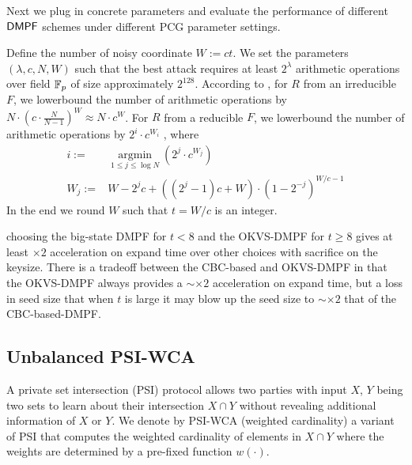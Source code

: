 

Next we plug in concrete parameters and evaluate the performance of different ${\sf DMPF}$ schemes under different PCG parameter settings. 

Define the number of noisy coordinate $W:=ct$. We set the parameters $(\lambda, c, N, W)$ such that the best attack requires at least $2^\lambda$ arithmetic operations over field $\mathbb{F}_p$ of size approximately $2^{128}$. According to \cite{cryptoeprint:2022/1035}, for $R$ from an irreducible $F$, we lowerbound the number of arithmetic operations by $N\cdot (c\cdot \frac{N}{N-1})^W\approx N\cdot c^W$.  For $R$ from a reducible $F$, we lowerbound the number of arithmetic operations by $2^i\cdot c^{W_i}$ , where 
\[
  \begin{split}
    i:=&\mathop{\arg\min}\limits_{1\le j\le \log N}\left(2^j\cdot c^{W_j}\right)\\ W_j:=&W-2^jc+((2^j-1)c+W)\cdot \left(1-2^{-j}\right)^{W/c-1}
  \end{split}
\]
 In the end we round $W$ such that $t=W/c$ is an integer. 


 choosing the big-state DMPF for $t<8$ and the OKVS-DMPF for $t\ge 8$ gives at least $\times 2$ acceleration on expand time over other choices with sacrifice on the keysize. There is a tradeoff between the CBC-based and OKVS-DMPF in that the OKVS-DMPF always provides a $\sim\times 2$ acceleration on expand time, but a loss in seed size that when $t$ is large it may blow up the seed size to $\sim \times 2$ that of the CBC-based-DMPF. 

\subsection{Unbalanced PSI-WCA}
A private set intersection (PSI) protocol allows two parties with input $X$, $Y$ being two sets to learn about their intersection $X\cap Y$ without revealing additional information of $X$ or $Y$. We denote by PSI-WCA (weighted cardinality) a variant of PSI that computes the weighted cardinality of elements in $X\cap Y$ where the weights are determined by a pre-fixed function $w(\cdot)$. 

